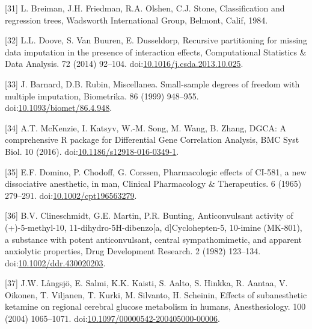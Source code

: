 \documentclass[man]{apa6}
\begin{document}
\leavevmode\hypertarget{ref-breimanClassificationRegressionTrees1984}{}%
{[}31{]} L. Breiman, J.H. Friedman, R.A. Olshen, C.J. Stone, Classification and regression trees, Wadsworth International Group, Belmont, Calif, 1984.

\leavevmode\hypertarget{ref-dooveRecursivePartitioningMissing2014}{}%
{[}32{]} L.L. Doove, S. Van Buuren, E. Dusseldorp, Recursive partitioning for missing data imputation in the presence of interaction effects, Computational Statistics \& Data Analysis. 72 (2014) 92--104. doi:\href{https://doi.org/10.1016/j.csda.2013.10.025}{10.1016/j.csda.2013.10.025}.

\leavevmode\hypertarget{ref-barnardMiscellaneaSmallsampleDegrees1999}{}%
{[}33{]} J. Barnard, D.B. Rubin, Miscellanea. Small-sample degrees of freedom with multiple imputation, Biometrika. 86 (1999) 948--955. doi:\href{https://doi.org/10.1093/biomet/86.4.948}{10.1093/biomet/86.4.948}.

\leavevmode\hypertarget{ref-mckenzieDGCAComprehensivePackage2016}{}%
{[}34{]} A.T. McKenzie, I. Katsyv, W.-M. Song, M. Wang, B. Zhang, DGCA: A comprehensive R package for Differential Gene Correlation Analysis, BMC Syst Biol. 10 (2016). doi:\href{https://doi.org/10.1186/s12918-016-0349-1}{10.1186/s12918-016-0349-1}.

\leavevmode\hypertarget{ref-dominoPharmacologicEffectsCI5811965}{}%
{[}35{]} E.F. Domino, P. Chodoff, G. Corssen, Pharmacologic effects of CI-581, a new dissociative anesthetic, in man, Clinical Pharmacology \& Therapeutics. 6 (1965) 279--291. doi:\href{https://doi.org/10.1002/cpt196563279}{10.1002/cpt196563279}.

\leavevmode\hypertarget{ref-clineschmidtAnticonvulsantActivity5methyl101982}{}%
{[}36{]} B.V. Clineschmidt, G.E. Martin, P.R. Bunting, Anticonvulsant activity of (+)-5-methyl-10, 11-dihydro-5H-dibenzo{[}a, d{]}Cyclohepten-5, 10-imine (MK-801), a substance with potent anticonvulsant, central sympathomimetic, and apparent anxiolytic properties, Drug Development Research. 2 (1982) 123--134. doi:\href{https://doi.org/10.1002/ddr.430020203}{10.1002/ddr.430020203}.

\leavevmode\hypertarget{ref-langsjoEffectsSubanestheticKetamine2004}{}%
{[}37{]} J.W. Långsjö, E. Salmi, K.K. Kaisti, S. Aalto, S. Hinkka, R. Aantaa, V. Oikonen, T. Viljanen, T. Kurki, M. Silvanto, H. Scheinin, Effects of subanesthetic ketamine on regional cerebral glucose metabolism in humans, Anesthesiology. 100 (2004) 1065--1071. doi:\href{https://doi.org/10.1097/00000542-200405000-00006}{10.1097/00000542-200405000-00006}.
\end{document}

